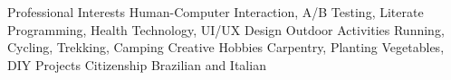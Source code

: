 \begin{cvinterests}
  \cvskill
    {Professional Interests}
    {Human-Computer Interaction, A/B Testing, Literate Programming, Health Technology, UI/UX Design}
  \cvskill
    {Outdoor Activities}
    {Running, Cycling, Trekking, Camping}
  \cvskill
    {Creative Hobbies}
    {Carpentry, Planting Vegetables, DIY Projects}
  \cvskill
    {Citizenship}
    {Brazilian and Italian}
\end{cvinterests}
